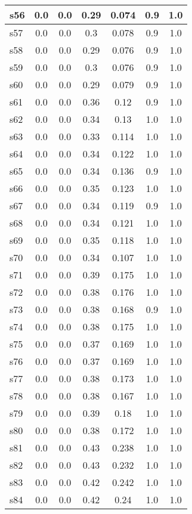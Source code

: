 \documentclass{article}
\begin{document}
\begin{tabular}{|l|c|c|c|c|c|c|}
\hline
s56 &0.0 & 0.0 & 0.29 & 0.074 & 0.9 & 1.0\\
\hline
s57 &0.0 & 0.0 & 0.3 & 0.078 & 0.9 & 1.0\\
\hline
s58 &0.0 & 0.0 & 0.29 & 0.076 & 0.9 & 1.0\\
\hline
s59 &0.0 & 0.0 & 0.3 & 0.076 & 0.9 & 1.0\\
\hline
s60 &0.0 & 0.0 & 0.29 & 0.079 & 0.9 & 1.0\\
\hline
s61 &0.0 & 0.0 & 0.36 & 0.12 & 0.9 & 1.0\\
\hline
s62 &0.0 & 0.0 & 0.34 & 0.13 & 1.0 & 1.0\\
\hline
s63 &0.0 & 0.0 & 0.33 & 0.114 & 1.0 & 1.0\\
\hline
s64 &0.0 & 0.0 & 0.34 & 0.122 & 1.0 & 1.0\\
\hline
s65 &0.0 & 0.0 & 0.34 & 0.136 & 0.9 & 1.0\\
\hline
s66 &0.0 & 0.0 & 0.35 & 0.123 & 1.0 & 1.0\\
\hline
s67 &0.0 & 0.0 & 0.34 & 0.119 & 0.9 & 1.0\\
\hline
s68 &0.0 & 0.0 & 0.34 & 0.121 & 1.0 & 1.0\\
\hline
s69 &0.0 & 0.0 & 0.35 & 0.118 & 1.0 & 1.0\\
\hline
s70 &0.0 & 0.0 & 0.34 & 0.107 & 1.0 & 1.0\\
\hline
s71 &0.0 & 0.0 & 0.39 & 0.175 & 1.0 & 1.0\\
\hline
s72 &0.0 & 0.0 & 0.38 & 0.176 & 1.0 & 1.0\\
\hline
s73 &0.0 & 0.0 & 0.38 & 0.168 & 0.9 & 1.0\\
\hline
s74 &0.0 & 0.0 & 0.38 & 0.175 & 1.0 & 1.0\\
\hline
s75 &0.0 & 0.0 & 0.37 & 0.169 & 1.0 & 1.0\\
\hline
s76 &0.0 & 0.0 & 0.37 & 0.169 & 1.0 & 1.0\\
\hline
s77 &0.0 & 0.0 & 0.38 & 0.173 & 1.0 & 1.0\\
\hline
s78 &0.0 & 0.0 & 0.38 & 0.167 & 1.0 & 1.0\\
\hline
s79 &0.0 & 0.0 & 0.39 & 0.18 & 1.0 & 1.0\\
\hline
s80 &0.0 & 0.0 & 0.38 & 0.172 & 1.0 & 1.0\\
\hline
s81 &0.0 & 0.0 & 0.43 & 0.238 & 1.0 & 1.0\\
\hline
s82 &0.0 & 0.0 & 0.43 & 0.232 & 1.0 & 1.0\\
\hline
s83 &0.0 & 0.0 & 0.42 & 0.242 & 1.0 & 1.0\\
\hline
s84 &0.0 & 0.0 & 0.42 & 0.24 & 1.0 & 1.0\\

\end{tabular}
\end{document}
